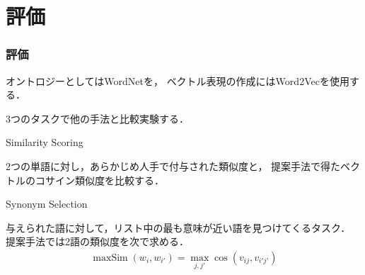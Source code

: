 \documentclass[10pt,usepdftitle=false,hyperref={unicode}]{beamer}
\DeclareMathOperator*{\maxSim}{maxSim}
\newenvironment{wideenumerate}{\enumerate\addtolength{\itemsep}{1em}}{\endenumerate}
\newcommand{\parentheses}[1]{\left(#1\right)}
\begin{document}
\section{評価}
\begin{frame}
\frametitle{評価}
オントロジーとしてはWordNetを，
ベクトル表現の作成にはWord2Vecを使用する．

\bigskip

3つのタスクで他の手法と比較実験する．

\bigskip

\begin{wideenumerate}
    \item Similarity Scoring

        2つの単語に対し，あらかじめ人手で付与された類似度と，
        提案手法で得たベクトルのコサイン類似度を比較する．

    \item Synonym Selection

        与えられた語に対して，リスト中の最も意味が近い語を見つけてくるタスク．
        提案手法では2語の類似度を次で求める．
        \begin{align}
            \maxSim \parentheses{w_i,w_{i'}} = \max_{j,j'} \cos \parentheses{v_{ij}, v_{i'j'}}
        \tag{9}
        \end{align}
\end{wideenumerate}
\end{frame}
\end{document}
